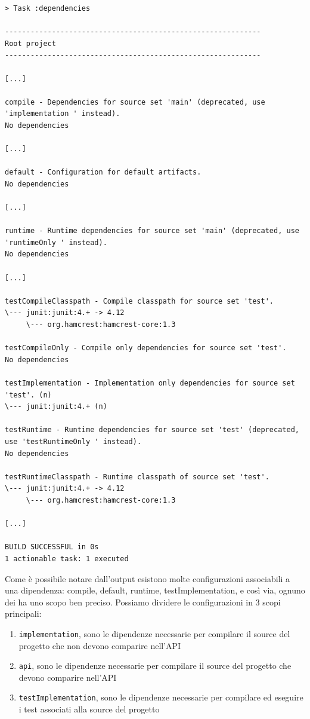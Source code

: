 \begin{verbatim}
> Task :dependencies 

------------------------------------------------------------
Root project
------------------------------------------------------------

[...]

compile - Dependencies for source set 'main' (deprecated, use 'implementation ' instead).
No dependencies

[...]

default - Configuration for default artifacts.
No dependencies

[...]

runtime - Runtime dependencies for source set 'main' (deprecated, use 'runtimeOnly ' instead).
No dependencies

[...]

testCompileClasspath - Compile classpath for source set 'test'.
\--- junit:junit:4.+ -> 4.12
     \--- org.hamcrest:hamcrest-core:1.3

testCompileOnly - Compile only dependencies for source set 'test'.
No dependencies

testImplementation - Implementation only dependencies for source set 'test'. (n)
\--- junit:junit:4.+ (n)

testRuntime - Runtime dependencies for source set 'test' (deprecated, use 'testRuntimeOnly ' instead).
No dependencies

testRuntimeClasspath - Runtime classpath of source set 'test'.
\--- junit:junit:4.+ -> 4.12
     \--- org.hamcrest:hamcrest-core:1.3

[...]

BUILD SUCCESSFUL in 0s
1 actionable task: 1 executed \end{verbatim}
Come è possibile notare dall'output esistono molte configurazioni associabili a una dipendenza: compile, default, runtime, testImplementation, e così via, ognuno dei ha uno scopo ben preciso. Possiamo dividere le configurazioni in 3 scopi principali:
\begin{enumerate}
    \item \texttt{implementation}, sono le dipendenze necessarie per compilare il source del progetto che non devono comparire nell'API
    \item \texttt{api}, sono le dipendenze necessarie per compilare il source del progetto che devono comparire nell'API
    \item \texttt{testImplementation}, sono le dipendenze necessarie per compilare ed eseguire i test associati alla source del progetto
\end{enumerate}
